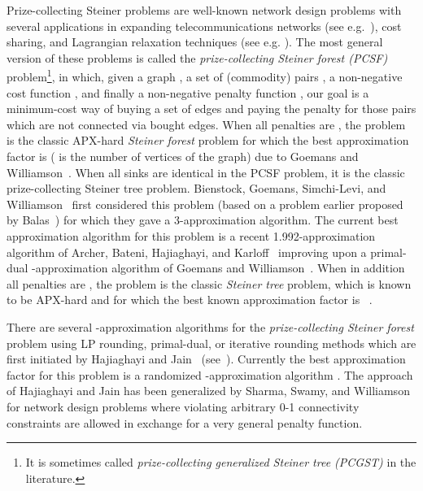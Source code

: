 \documentclass[extras,11pt]{article} \usepackage{fullpage}
\theoremstyle{mytheorem}
\newcommand{\prob}[1]{\textit{#1}}
\begin{document}
Prize-collecting Steiner problems are well-known
 network design problems with several applications in
expanding telecommunications networks (see e.g.~\cite{JMP00,SCRS}),
cost sharing, and Lagrangian relaxation techniques (see e.g.
\cite{JV01,CRW01}). The most general version of these problems is
called the {\em prize-collecting Steiner forest (PCSF)}
problem\footnote{It is sometimes called
{\em prize-collecting generalized Steiner tree (PCGST)} in the literature.}, in which,
given a graph , a set of (commodity) pairs
, a non-negative cost function
, and finally a non-negative penalty
function , our goal is a
minimum-cost way of buying a set of edges and paying the penalty for
those pairs which are not connected via bought edges. When all
penalties are , the problem is the classic APX-hard
\prob{Steiner forest} problem for which the best approximation
factor is  ( is the number of vertices of the
graph) due to Goemans and Williamson~\cite{GW95}. When all sinks are
identical in the PCSF problem, it is the classic prize-collecting
Steiner tree problem. Bienstock, Goemans, Simchi-Levi, and
Williamson~\cite{BGSW93} first considered this problem (based on a
problem earlier proposed by Balas~\cite{Bal89}) for which they gave
a 3-approximation algorithm.
The current best approximation algorithm for this problem is a
recent 1.992-approximation algorithm of Archer, Bateni, Hajiaghayi,
and Karloff~\cite{ABHK09} improving upon a primal-dual
-approximation algorithm of Goemans
and Williamson~\cite{GW95}. When in addition all penalties are
, the problem is the classic \prob{Steiner tree} problem,
which is known to be APX-hard \cite{cr:7} and for which the best
known approximation factor is ~\cite{cr:31}.


  There are several
-approximation algorithms for the \prob{prize-collecting Steiner forest}
problem using LP rounding, primal-dual, or iterative rounding methods which
are first initiated by Hajiaghayi and Jain~\cite{HJ06}
(see~\cite{BGSW93,Hajiagha:iter}).
Currently the best approximation factor for this problem is a
randomized -approximation algorithm \cite{HJ06}. The approach
of Hajiaghayi and Jain has been generalized by Sharma, Swamy, and
Williamson~\cite{SSW07} for network design problems where violating
arbitrary 0-1 connectivity constraints are allowed in exchange for a
very general penalty function.
\end{document}
